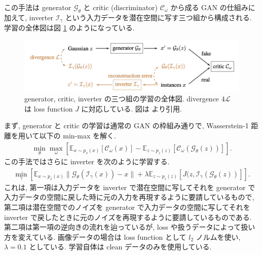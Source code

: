 この手法は generator $\mathcal{G}_{\theta}$ と critic (discriminator) $\mathcal{C}_{\omega}$ から成る GAN の仕組みに加えて, inverter $\mathcal{I}_{\gamma}$ という入力データを潜在空間に写す三つ組から構成される.
学習の全体図は図 \ref{fig:generating-natural-training} のようになっている.
%
\begin{figure}[htbp]
\begin{center}
\includegraphics[width=14.0cm]{figures/generating-natural-training.pdf}
\end{center}
\caption{
generator, critic, inverter の三つ組の学習の全体図.
divergence $4\mathcal{L}$ は loss function $J$ に対応している.
図は \cite{zhao2017generating} より引用.
}
\label{fig:generating-natural-training}
\end{figure}
%
まず, generator と critic の学習は通常の GAN の枠組み通りで, Wasserstein-1 距離を用いて以下の min-max を解く.
%
\begin{eqnarray}
\min_{\theta} \max_{\omega} \left[ \mathbb{E}_{x \sim p_x (x)} \left[ \mathcal{C}_{\omega} (x) \right] - \mathbb{E}_{z \sim p_z (z)} \left[ \mathcal{C}_{\omega} (\mathcal{G}_{\theta} (z)) \right] \right].
\label{eq:gan-wasserstein}
\end{eqnarray}
%
この手法ではさらに inverter を次のように学習する.
%
\begin{eqnarray}
\min_{\gamma} \left[ \mathbb{E}_{x \sim p_x (x)} \| \mathcal{G}_{\theta} (\mathcal{I}_{\gamma} (x)) - x \| + \lambda \mathbb{E}_{z \sim p_z (z)} \left[ J(z, \mathcal{I}_{\gamma} (\mathcal{G}_{\theta} (z)) \right] \right].
\label{eq:inverter-training}
\end{eqnarray}
%
これは, 第一項は入力データを inverter で潜在空間に写してそれを generator で入力データの空間に戻した時に元の入力を再現するように要請しているもので, 第二項は潜在空間でのノイズを generator で入力データの空間に写してそれを inverter で戻したときに元のノイズを再現するように要請しているものである.
第二項は第一項の逆向きの流れを辿っているが, loss や扱うデータによって扱い方を変えている.
画像データの場合は loss function として $l_2$ ノルムを使い, $\lambda = 0.1$ としている.
学習自体は clean データのみを使用している.

